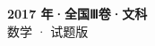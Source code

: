 \documentclass[zihao=-4, a4paper]{ctexart}
\begin{document}
\begin{center}
  {\Large\bfseries 2017 年·全国Ⅲ卷·文科}\\[4pt]
  {\large 数学 · 试题版}
\end{center}
\medskip
{}

\end{document}
